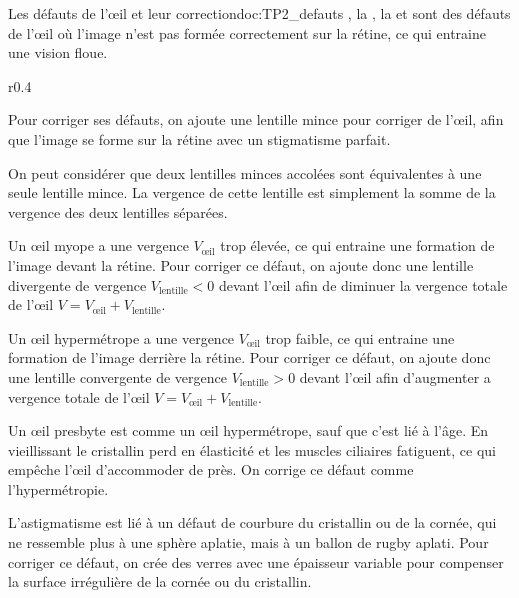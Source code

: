 \begin{doc}{Les défauts de l'œil et leur correction}{doc:TP2_defauts}
  , la , la  et  sont des défauts de l'œil où l'image n'est pas formée correctement sur la rétine, ce qui entraine une vision floue.

  \begin{wrapfigure}[10]{r}{0.4\linewidth}
    \centering
    \vspace*{-2pt}
    
  \end{wrapfigure}
  
  Pour corriger ses défauts, on ajoute une lentille mince pour corriger  de l'œil, afin que l'image se forme sur la rétine avec un stigmatisme parfait.

  \begin{importants}
    On peut considérer que deux lentilles minces accolées sont équivalentes à une seule lentille mince.
    La vergence de cette lentille est simplement la somme de la vergence des deux lentilles séparées.
  \end{importants}

  \pointCyan {}

  Un œil myope a une vergence $V_\text{œil}$ trop élevée, ce qui entraine une formation de l'image devant la rétine.
  Pour corriger ce défaut, on ajoute donc une lentille divergente de vergence $V_\text{lentille} < 0$ devant l'œil afin de diminuer la vergence totale de l'œil $V = V_\text{œil} + V_\text{lentille}$.

  \pointCyan {}

  Un œil hypermétrope a une vergence $V_\text{œil}$ trop faible, ce qui entraine une formation de l'image derrière la rétine.
  Pour corriger ce défaut, on ajoute donc une lentille convergente de vergence $V_\text{lentille} > 0$ devant l'œil afin d'augmenter a vergence totale de l'œil $V = V_\text{œil} + V_\text{lentille}$.

  \pointCyan {}

  Un œil presbyte est comme un œil hypermétrope, sauf que c'est lié à l'âge.
  En vieillissant le cristallin perd en élasticité et les muscles ciliaires fatiguent, ce qui empêche l'œil d'accommoder de près.
  On corrige ce défaut comme l'hypermétropie.

  \pointCyan {}

  L'astigmatisme est lié à un défaut de courbure du cristallin ou de la cornée, qui ne ressemble plus à une sphère aplatie, mais à un ballon de rugby aplati.
  Pour corriger ce défaut, on crée des verres avec une épaisseur variable pour compenser la surface irrégulière de la cornée ou du cristallin.
\end{doc}

